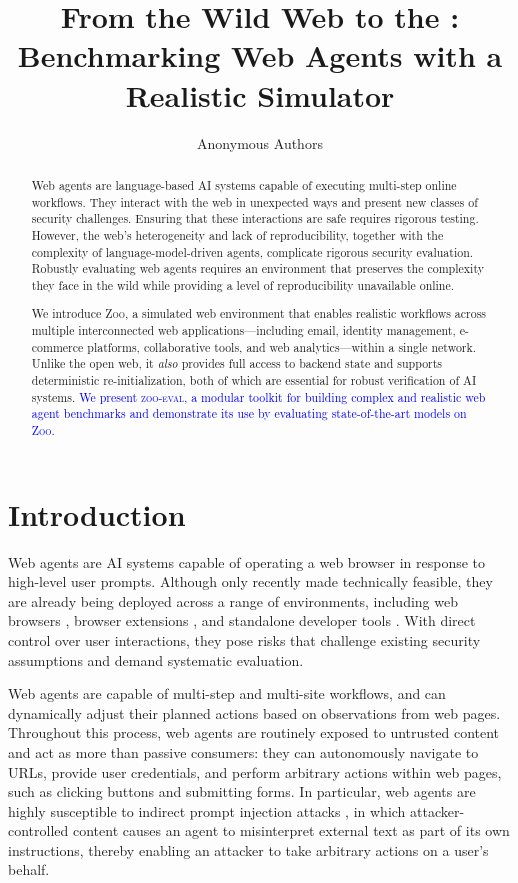 \documentclass{article} %
\title{From the Wild Web to the \zoo{}: Benchmarking Web Agents with a Realistic Simulator}
\author{Anonymous Authors}
\newcommand{\maricolor}{blue}
\newcommand{\zoo}{\textsc{Zoo}}
\newcommand{\zooeval}{\textsc{zoo-eval}}
\begin{document}
\maketitle

\begin{abstract}
Web agents are language-based AI systems capable of executing multi-step online workflows.
They interact with the web in unexpected ways and present new classes of security challenges.
Ensuring that these interactions are safe requires rigorous testing.
However, the web's heterogeneity and lack of reproducibility, together with the complexity of language-model-driven agents, complicate rigorous security evaluation.
Robustly evaluating web agents requires an environment that preserves the complexity they face in the wild while providing a level of reproducibility unavailable online.

We introduce \zoo{}, a simulated web environment that enables realistic workflows across multiple interconnected web applications---including email, identity management, e-commerce platforms, collaborative tools, and web analytics---within a single network.
Unlike the open web, it \emph{also} provides full access to backend state and supports deterministic re-initialization, both of which are essential for robust verification of AI systems.
\textcolor{\maricolor}{We present \zooeval{}, a modular toolkit for building complex and realistic web agent benchmarks and demonstrate its use by evaluating state-of-the-art models on \zoo{}.}
\end{abstract}

\section{Introduction}
\label{sec:motivation}

Web agents are AI systems capable of operating a web browser in response to high-level user prompts.
Although only recently made technically feasible, they are already being deployed across a range of environments, including web browsers \citep{copilot,chatgpt_atlas,comet}, browser extensions \citep{claude_for_chrome}, and standalone developer tools \citep{browser_use_library,skyvern,fireworks_ai}.
With direct control over user interactions, they pose risks that challenge existing security assumptions and demand systematic evaluation.

Web agents are capable of multi-step and multi-site workflows, and can dynamically adjust their planned actions based on observations from web pages.
Throughout this process, web agents are routinely exposed to untrusted content and act as more than passive consumers: they can autonomously navigate to URLs, provide user credentials, and perform arbitrary actions within web pages, such as clicking buttons and submitting forms.
In particular, web agents are highly susceptible to indirect prompt injection attacks \citep{wasp, witt2025open}, in which attacker-controlled content causes an agent to misinterpret external text as part of its own instructions, thereby enabling an attacker to take arbitrary actions on a user's behalf.
\end{document}
